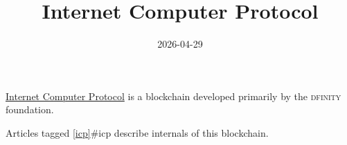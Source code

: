 \documentclass{note}
\title{Internet Computer Protocol}
\date{2026-04-29}
\begin{document}
\href{https://internetcomputer.org/}{Internet Computer Protocol} is a blockchain developed primarily by the \textsc{dfinity} foundation.

Articles tagged \ref{icp}{#icp} describe internals of this blockchain.
\end{document}
